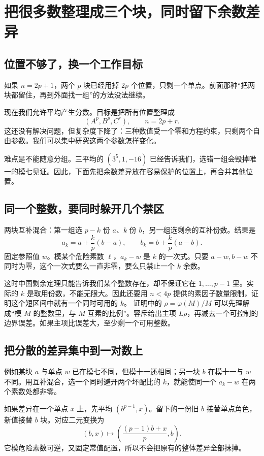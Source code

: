 \chapter{把很多数整理成三个块，同时留下余数差异}\label{sec:compression}
\section{位置不够了，换一个工作目标}
如果 $n=2p+1$，两个 $p$ 块已经用掉 $2p$ 个位置，只剩一个单点。前面那种“把两块都留住，再到外面找一组”的方法没法继续。

现在我们允许平均产生分数。目标是把所有位置整理成
\[(A^p,B^p,C^r),\qquad n=2p+r.
\]
这还没有解决问题，但复杂度下降了：三种数值受一个零和方程约束，只剩两个自由参数。我们可以集中研究这两个参数怎样变化。

难点是不能随意分组。三平均的 $(3^5,1,-16)$ 已经告诉我们，选错一组会毁掉唯一的模七见证。因此，下面先把余数差异放在容易保护的位置上，再合并其他位置。

\section{同一个整数，要同时躲开几个禁区}
两块互补混合：第一组选 $p-k$ 份 $a$、$k$ 份 $b$，另一组选剩余的互补份数。结果是
\begin{equation}\label{eq:mix-pair}
a_k=a+\frac{k}{p}(b-a),\qquad b_k=b+\frac{k}{p}(a-b).
\end{equation}
固定参照值 $w$。模某个危险素数 $\ell$，$a_k-w$ 是 $k$ 的一次式。只要 $a-w,b-w$ 不同时为零，这个一次式要么一直非零，要么只禁止一个 $k$ 余数。

这时中国剩余定理只能告诉我们某个整数存在，却不保证它在 $1,\ldots,p-1$ 里。实际的 $k$ 是取用份数，不能无限大。因此还要用 $n<4p$ 提供的素因子数量限制，证明这个短区间中就有一个同时可用的 $k$。
证明中的 $\rho=\varphi(M)/M$ 可以先理解成“模 $M$ 的整数里，与 $M$ 互素的比例”。容斥给出主项 $L\rho$，再减去一个可控制的边界误差。如果主项比误差大，至少剩一个可用整数。

\section{把分散的差异集中到一对数上}
例如某块 $a$ 与单点 $w$ 已在模七不同，但模十一还相同；另一块 $b$ 在模十一与 $w$ 不同。用互补混合，选一个同时避开两个坏配比的 $k$，就能使同一个 $a_k-w$ 在两个素数处都非零。

如果差异在一个单点 $x$ 上，先平均 $(b^{p-1},x)$。留下的一份旧 $b$ 接替单点角色，新值接替 $b$ 块。对应二元变换为
\[(b,x)\mapsto\left(\frac{(p-1)b+x}{p},b\right).
\]
它模危险素数可逆，又固定常值配置，所以不会把原有的整体差异全部抹掉。

